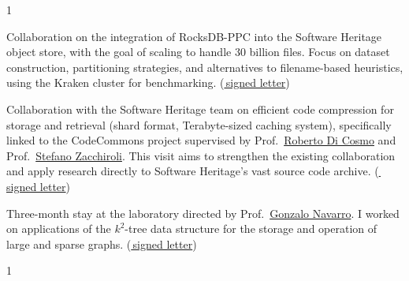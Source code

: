 \documentclass[10pt,a4paper,ragged2e,academicons]{altacv}
\newif\ifshortcv
\begin{document}
\begin{paracol}{1}
\smallskip


\ifshortcv\else%
Collaboration on the integration of RocksDB-PPC into the Software Heritage object store, with the goal of scaling to handle 30 billion files. Focus on dataset construction, partitioning strategies, and alternatives to filename-based heuristics, using the Kraken cluster for benchmarking. (\href{https://www.francescotosoni.it/static/20251117_invitation_grenoble.pdf}{\faFileSignature\,signed letter})

\divider
\fi

Collaboration with the Software Heritage team on efficient code compression for storage and retrieval (shard format, Terabyte-sized caching system), specifically linked to the CodeCommons project supervised by Prof.~\href{https://www.dicosmo.org}{Roberto Di Cosmo} and Prof.~\href{https://upsilon.cc/~zack/}{Stefano Zacchiroli}. This visit aims to strengthen the existing collaboration and apply research directly to Software Heritage's vast source code archive. (\href{https://www.francescotosoni.it/static/2025-06-Invitation-Tosoni.pdf}{\faFileSignature\,signed letter})

\divider

Three-month stay at the laboratory directed by Prof.~\href{https://users.dcc.uchile.cl/~gnavarro/}{Gonzalo Navarro}. I worked on applications of the $k^2$-tree data structure for the storage and operation of large and sparse graphs. (\href{https://www.francescotosoni.it/static/santiago.pdf}{\faFileSignature\,signed letter})

\medskip

\end{paracol}
\begin{paracol}{1}

\smallskip


\end{paracol}
\end{document}
